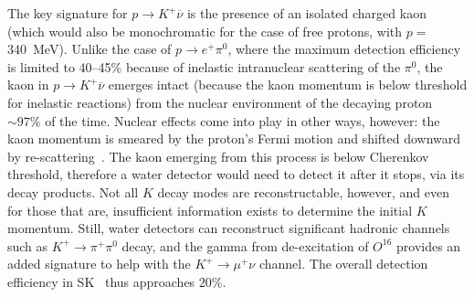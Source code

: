 The key signature for $p\to K^+\overline{\nu}$ is the presence of an
isolated charged kaon (which would also be monochromatic 
for the case of free protons, with $p=$\SI{340}{\MeV}).  
Unlike the case of $p\to e^+\pi^0$, where the maximum
detection efficiency is limited to 40--45\% because of inelastic
intranuclear scattering of the $\pi^0$, the kaon in $p\to
K^+\overline{\nu}$ emerges intact (because the kaon momentum is 
below threshold for inelastic reactions)
from the nuclear environment of the decaying proton $\sim 97\%$ of the
time.  Nuclear effects come into play in other ways, however: the kaon
momentum is smeared by the proton's Fermi motion and shifted downward
by re-scattering~\cite{Stefan:2008zi}. 
The kaon emerging from this process is below Cherenkov threshold,
therefore a water detector would need to detect it after it stops, via its
decay products.  Not all $K$ decay modes are reconstructable, however,
and even for those that are, insufficient information exists to
determine the initial $K$ momentum.  Still, water detectors can
reconstruct significant hadronic channels such as $K^+\to\pi^+\pi^0$
decay, and the  gamma from de-excitation of $O^{16}$ provides an
added signature to help with the $K^+\to\mu^+\nu$ channel. The overall
detection efficiency in SK~\cite{kearns_isoups} thus approaches
$20\%$.

